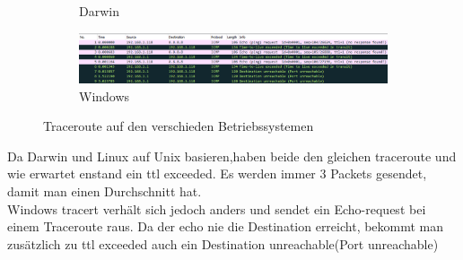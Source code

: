 \begin{figure}[!htb]
\begin{subfigure}{\textwidth}
        \caption{Darwin}
    \end{subfigure}
    \begin{subfigure}{\textwidth}
        \includegraphics[width=\textwidth,height=.85\textwidth,keepaspectratio]{./img/windows_tracert.png}
        \caption{Windows}
    \end{subfigure}
    \caption{Traceroute auf den verschieden Betriebssystemen}
\end{figure}
\noindent
Da Darwin und Linux auf Unix basieren,haben beide den gleichen traceroute und wie erwartet enstand ein ttl exceeded. Es werden immer 3 Packets gesendet, damit man einen Durchschnitt hat.\\
Windows tracert verhält sich jedoch anders und sendet ein Echo-request bei einem Traceroute raus. Da der echo nie die Destination erreicht, bekommt man zusätzlich zu ttl exceeded auch ein Destination unreachable(Port unreachable)